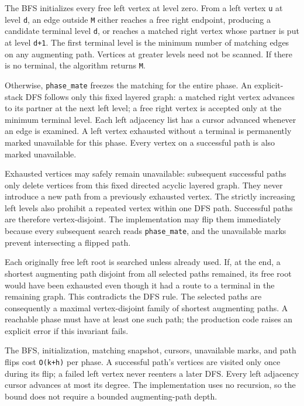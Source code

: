 The BFS initializes every free left vertex at level zero. From a left vertex \texttt{u} at level \texttt{d}, an edge outside \texttt{M} either reaches a free right endpoint, producing a candidate terminal level \texttt{d}, or reaches a matched right vertex whose partner is put at level \texttt{d+1}. The first terminal level is the minimum number of matching edges on any augmenting path. Vertices at greater levels need not be scanned. If there is no terminal, the algorithm returns \texttt{M}.

Otherwise, \texttt{phase\_mate} freezes the matching for the entire phase. An explicit-stack DFS follows only this fixed layered graph: a matched right vertex advances to its partner at the next left level; a free right vertex is accepted only at the minimum terminal level. Each left adjacency list has a cursor advanced whenever an edge is examined. A left vertex exhausted without a terminal is permanently marked unavailable for this phase. Every vertex on a successful path is also marked unavailable.

Exhausted vertices may safely remain unavailable: subsequent successful paths only delete vertices from this fixed directed acyclic layered graph. They never introduce a new path from a previously exhausted vertex. The strictly increasing left levels also prohibit a repeated vertex within one DFS path. Successful paths are therefore vertex-disjoint. The implementation may flip them immediately because every subsequent search reads \texttt{phase\_mate}, and the unavailable marks prevent intersecting a flipped path.

Each originally free left root is searched unless already used. If, at the end, a shortest augmenting path disjoint from all selected paths remained, its free root would have been exhausted even though it had a route to a terminal in the remaining graph. This contradicts the DFS rule. The selected paths are consequently a maximal vertex-disjoint family of shortest augmenting paths. A reachable phase must have at least one such path; the production code raises an explicit error if this invariant fails.

The BFS, initialization, matching snapshot, cursors, unavailable marks, and path flips cost \texttt{O(k+h)} per phase. A successful path's vertices are visited only once during its flip; a failed left vertex never reenters a later DFS. Every left adjacency cursor advances at most its degree. The implementation uses no recursion, so the bound does not require a bounded augmenting-path depth.

